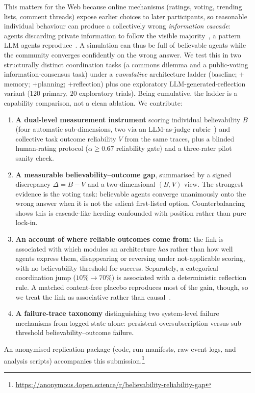 \documentclass[runningheads]{llncs}
\begin{document}
This matters for the Web because online mechanisms (ratings, voting, trending lists, comment
threads) expose earlier choices to later participants, so reasonable individual behaviour can
produce a collectively wrong \emph{information cascade}: agents discarding private information to
follow the visible majority~\cite{bikhchandani1992theory}, a pattern LLM agents
reproduce~\cite{cho2025herd,jain2025social,zhong2025conformity}. A simulation can thus be full of
believable agents while the community converges confidently on the wrong answer. We test this in
two structurally distinct coordination tasks (a commons dilemma and a public-voting
information-consensus task) under a \emph{cumulative} architecture ladder (baseline;
$+$memory; $+$planning; $+$reflection) plus one exploratory LLM-generated-reflection variant (120
primary, 20 exploratory trials). Being cumulative, the ladder is a capability comparison, not a
clean ablation. We contribute:
\begin{enumerate}
  \item \textbf{A dual-level measurement instrument} scoring individual believability $B$ (four
  automatic sub-dimensions, two via an LLM-as-judge rubric~\cite{zheng2023judging}) and collective
  task outcome reliability $V$ from the same traces, plus a blinded human-rating protocol
  ($\alpha\geq0.67$ reliability gate) and a three-rater pilot sanity check.
  \item \textbf{A measurable believability--outcome gap}, summarised by a signed discrepancy
  $\Delta=B-V$ and a two-dimensional $(B,V)$ view. The strongest evidence is the voting task:
  believable agents converge unanimously onto the wrong answer when it is not the salient
  first-listed option. Counterbalancing shows this is cascade-like herding confounded with
  position rather than pure lock-in.
  \item \textbf{An account of where reliable outcomes come from:} the link is associated with which
  modules an architecture \emph{has} rather than how well agents express them, disappearing or
  reversing under not-applicable scoring, with no believability threshold for success. Separately,
  a categorical coordination jump ($10\%\rightarrow70\%$) is associated with a
  deterministic reflection rule. A matched content-free placebo reproduces most of the gain, though,
  so we treat the link as associative rather than causal~\cite{aharon2026tacit}.
  \item \textbf{A failure-trace taxonomy} distinguishing two system-level failure mechanisms from
  logged state alone: persistent oversubscription versus sub-threshold believability--outcome
  failure.
\end{enumerate}
\noindent An anonymised replication package (code, run manifests, raw event logs, and
analysis scripts) accompanies this submission.\footnote{\url{https://anonymous.4open.science/r/believability-reliability-gap}}
\end{document}
